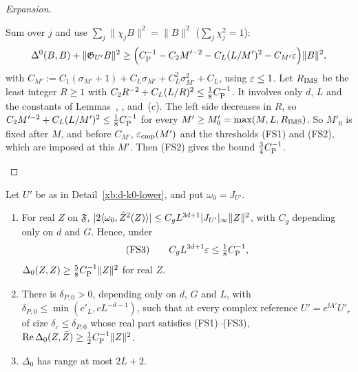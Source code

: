 \begin{proof}[Expansion]
\begin{step}
Sum over $j$ and use $\sum_j\|\chi_jB\|^2=\|B\|^2$ ($\sum_j\chi_j^2=1$):
\[
\Delta^0(B,B)+\|\mathfrak G_{U'}B\|^2\ge\Big(C_{\rm P}^{-1}-C_2M'^{-2}-C_L(L/M')^2-C_{M'}\varepsilon\Big)\|B\|^2,
\]
with $C_{M'}:=C_1(\sigma_{M'}+1)+C_L\sigma_{M'}+C_L^2\sigma_{M'}^2+C_L$, using $\varepsilon\le1$. Let $R_{\rm IMS}$ be the least integer $R\ge1$ with $C_2R^{-2}+C_L(L/R)^2\le\frac18C_{\rm P}^{-1}$. It involves only $d$, $L$ and the constants of Lemmas~, ,  and~(c). The left side decreases in $R$, so $C_2M'^{-2}+C_L(L/M')^2\le\frac18C_{\rm P}^{-1}$ for every $M'\ge M'_0=\max(M,L,R_{\rm IMS})$. So $M'_0$ is fixed after $M$, and before $C_{M'}$, $\varepsilon_{\rm cmp}(M')$ and the thresholds (FS1) and (FS2), which are imposed at this $M'$. Then (FS2) gives the bound $\frac34C_{\rm P}^{-1}$.
\end{step}
\end{proof}

\begin{detail}\label{xb:d-k0-grad}
Let $U'$ be as in Detail~\ref{xb:d-k0-lower}, and put $\omega_0=J_{U'}$.
\begin{enumerate}[label=(\alph*)]
\item For real $Z$ on $\mathfrak F$, $|2\langle \omega_0,\hat Z^2(Z)\rangle|\le C_gL^{3d+1}|J_{U'}|_\infty\|Z\|^2$, with $C_g$ depending only on $d$ and $G$. Hence, under
\begin{equation}\label{xb:eq-T3}
\text{(FS3)}\qquad C_gL^{3d+1}\varepsilon\le\tfrac18C_{\rm P}^{-1},
\end{equation}
$\Delta_0(Z,Z)\ge\frac58C_{\rm P}^{-1}\|Z\|^2$ for real $Z$.
\item There is $\delta_{P,0}>0$, depending only on $d$, $G$ and $L$, with $\delta_{P,0}\le\min(c'_L,cL^{-d-1})$, such that at every complex reference $U'=e^{\ii A'}U'_r$ of size $\delta_c\le\delta_{P,0}$ whose real part satisfies (FS1)--(FS3), $\operatorname{Re}\Delta_0(Z,\bar Z)\ge\frac12C_{\rm P}^{-1}\|Z\|^2$.
\item $\Delta_0$ has range at most $2L+2$.
\end{enumerate}
\end{detail}

